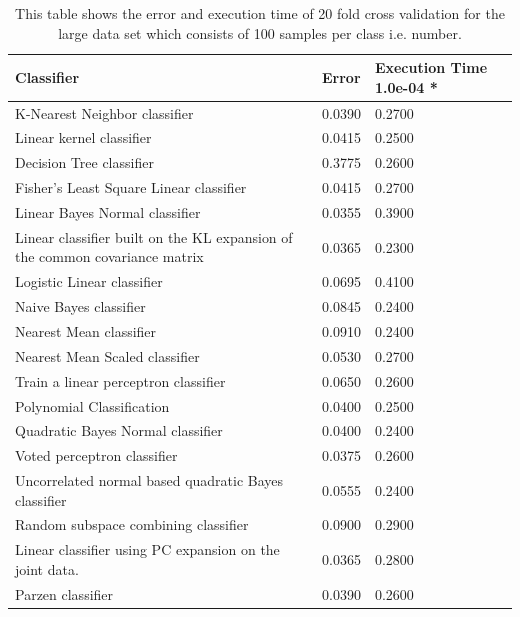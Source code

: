 \documentclass[%
        compressed,
        final,
        notitlepage,
        narroweqnarray,
        inline,
        twoside,
        ]{ieee}
\begin{document}
\begin{table}
    \begin{tabular} {p{5cm}lp{1.5cm}} %
        \hline
    Classifier & Error & Execution Time 1.0e-04 * \\
        \hline
K-Nearest Neighbor classifier & 0.0390 & 0.2700 \\
Linear kernel classifier & 0.0415 & 0.2500 \\
Decision Tree classifier & 0.3775 & 0.2600 \\
Fisher's Least Square Linear classifier & 0.0415 & 0.2700 \\
Linear Bayes Normal classifier & 0.0355 & 0.3900 \\
Linear classifier built on the KL expansion of the common covariance matrix & 0.0365 & 0.2300 \\
Logistic Linear classifier & 0.0695 & 0.4100 \\
Naive Bayes classifier & 0.0845 & 0.2400 \\
Nearest Mean classifier & 0.0910 & 0.2400 \\
Nearest Mean Scaled classifier & 0.0530 & 0.2700 \\
Train a linear perceptron classifier & 0.0650 & 0.2600 \\
Polynomial Classification & 0.0400 & 0.2500 \\
Quadratic Bayes Normal classifier & 0.0400 & 0.2400 \\
Voted perceptron classifier & 0.0375 & 0.2600 \\
Uncorrelated normal based quadratic Bayes classifier & 0.0555 & 0.2400 \\
Random subspace combining classifier & 0.0900 & 0.2900 \\
Linear classifier using PC expansion on the joint data. & 0.0365 & 0.2800 \\
Parzen classifier & 0.0390 & 0.2600 \\
        \hline
    \end{tabular}
    \caption{ This table shows the error and execution time of 20 fold cross
    validation for the large data set which consists of 100 samples per class
i.e. number.  }
        
\end{table}
\end{document}
